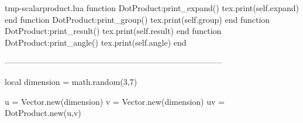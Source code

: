 \begin{filecontents*}{tmp-scalarproduct.lua}
function DotProduct:print_expand() tex.print(self.expand) end
function DotProduct:print_group() tex.print(self.group) end
function DotProduct:print_result() tex.print(self.result) end
function DotProduct:print_angle() tex.print(self.angle) end

--------------------------------------------------------------------------------

local dimension = math.random(3,7)

u = Vector.new(dimension)
v = Vector.new(dimension)
uv = DotProduct.new(u,v)


\end{filecontents*}

\documentclass{article}

\usepackage{amsmath}
\usepackage{enumerate}
\usepackage{siunitx}

\newcommand{\vect}[1]{\mathbf{#1}}
\newcommand{\norm}[1]{\lVert\vect{#1}\rVert}
\newcommand{\product}[2]{{#1}\cdot{#2}}
\newcommand{\vecprod}[2]{\vect{#1}\cdot\vect{#2}}


